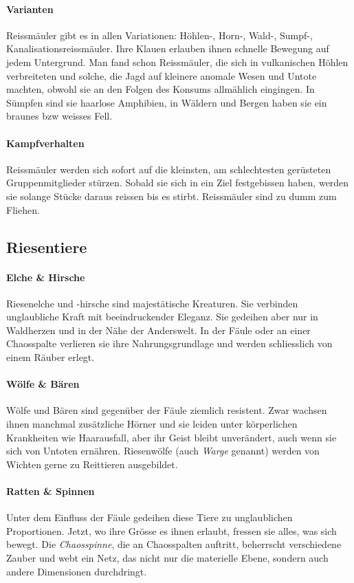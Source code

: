 \documentclass[12pt,twoside,twocolumn,openany]{book}
\begin{document}
\paragraph{Varianten} Reissmäuler gibt es in allen Variationen: Höhlen-, Horn-, Wald-, Sumpf-, Kanalisationsreissmäuler. Ihre Klauen erlauben ihnen schnelle Bewegung auf jedem Untergrund. Man fand schon Reissmäuler, die sich in vulkanischen Höhlen verbreiteten und solche, die Jagd auf kleinere anomale Wesen und Untote machten, obwohl sie an den Folgen des Konsums allmählich eingingen. In Sümpfen sind sie haarlose Amphibien, in Wäldern und Bergen haben sie ein braunes bzw weisses Fell. 

\paragraph{Kampfverhalten} Reissmäuler werden sich sofort auf die kleinsten, am schlechtesten gerüsteten Gruppenmitglieder stürzen. Sobald sie sich in ein Ziel festgebissen haben, werden sie solange Stücke daraus reissen bis es stirbt. Reissmäuler sind zu dumm zum Fliehen.

\subsection{Riesentiere}

\paragraph{Elche \& Hirsche} Riesenelche und -hirsche sind majestätische Kreaturen. Sie verbinden unglaubliche Kraft mit beeindruckender Eleganz. Sie gedeihen aber nur in Waldherzen und in der Nähe der Anderswelt. In der Fäule oder an einer Chaosspalte verlieren sie ihre Nahrungsgrundlage und werden schliesslich von einem Räuber erlegt.
\paragraph{Wölfe \& Bären} Wölfe und Bären sind gegenüber der Fäule ziemlich resistent. Zwar wachsen ihnen manchmal zusätzliche Hörner und sie leiden unter körperlichen Krankheiten wie Haarausfall, aber ihr Geist bleibt unverändert, auch wenn sie sich von Untoten ernähren. Riesenwölfe (auch \emph{Warge} genannt) werden von Wichten gerne zu Reittieren ausgebildet.
\paragraph{Ratten \& Spinnen} Unter dem Einfluss der Fäule gedeihen diese Tiere zu unglaublichen Proportionen. Jetzt, wo ihre Grösse es ihnen erlaubt, fressen sie alles, was sich bewegt. Die \emph{Chaosspinne}, die an Chaosspalten auftritt, beherrscht verschiedene Zauber und webt ein Netz, das nicht nur die materielle Ebene, sondern auch andere Dimensionen durchdringt.
\end{document}

